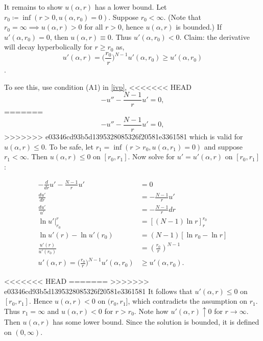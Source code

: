 It remains to show $u(\alpha,r)$ has a lower bound. Let $r_0\coloneqq\inf(r>0,u(\alpha,r_0)=0).$ Suppose $r_0<\infty$. (Note that $r_0=\infty\implies u(\alpha,r)>0$ for all $r>0$, hence $u(\alpha,r)$ is bounded.) If $u'(\alpha,r_0)=0$, then $u(\alpha,r)\equiv0$. Thus $u'(\alpha,r_0)<0$. Claim: the derivative will decay hyperbolically for $r\geq r_0$ as,  $$u'(\alpha,r)=\big(\frac{r_0}{r}\big)^{N-1}u'(\alpha,r_0)\geq u'(\alpha,r_0)$$.

To see this, use condition (A1) in \eqref{ivp},
<<<<<<< HEAD
$$-u''-\frac{N-1}{r}u'=0,$$%
=======
$$-u''-\frac{N-1}{r}u'=0,$$%
>>>>>>> e03346cd93b5d1395328085326f20581e3361581
which is valid for $u(\alpha,r)\leq0.$ To be safe, let $r_1=\inf(r>r_0,u(\alpha,r_1)=0)$ and suppose $r_1<\infty$. Then $u(\alpha,r)\leq0$ on $[r_0,r_1]$. Now solve for $u'=u'(\alpha,r)$ on $[r_0,r_1]$:

\begin{align*}
-\frac{d}{dr}u'-\frac{N-1}{r}u'&=0\\
\frac{du'}{dr}&=-\frac{N-1}{r}u'\\
\frac{du'}{u'}&=-\frac{N-1}{r}dr\\
\left.\ln{u'}\right\rvert_{r_0}^r&=\left[(N-1)\ln{r}\right]_r^{r_0}\\
\ln{u'(r)}-\ln{u'(r_0)}&=(N-1)\left[\ln{r_0}-\ln{r}\right]\\
\frac{u'(r)}{u'(r_0)}&=\left(\frac{r_0}{r}\right)^{N-1}\\
u'(\alpha,r)=\big(\frac{r_0}{r}\big)^{N-1}u'(\alpha,r_0)&\geq u'(\alpha,r_0).%
\end{align*}

<<<<<<< HEAD
=======
>>>>>>> e03346cd93b5d1395328085326f20581e3361581
It follows that $u'(\alpha,r)\leq0$ on $[r_0,r_1]$. Hence $u(\alpha,r)<0$ on $(r_0,r_1]$, which contradicts the assumption on $r_1$. Thus $r_1=\infty$ and $u(\alpha,r)<0$ for $r>r_0$. Note how $u'(\alpha,r)\uparrow0$ for $r\to\infty$. Then $u(\alpha,r)$ has some lower bound. Since the solution is bounded, it is defined on $(0,\infty)$.

